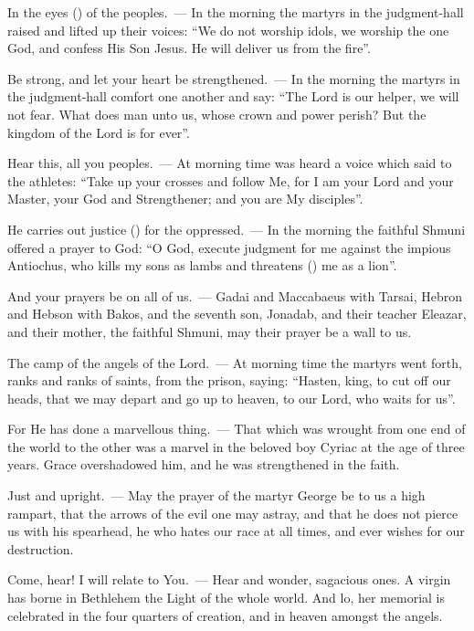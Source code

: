 \documentclass[12pt,twoside,a5paper]{article}
\begin{document}
\begin{halfparskip}
  In the eyes () of the peoples.~--- In the morning the martyrs in the judgment-hall raised and lifted up their voices: ``We do not worship idols, we worship the one God, and confess His Son Jesus. He will deliver us from the fire''.

  Be strong, and let your heart be strengthened.~--- In the morning the martyrs in the judgment-hall comfort one another and say: ``The Lord is our helper, we will not fear. What does man unto us, whose crown and power perish? But the kingdom of the Lord is for ever''.

  Hear this, all you peoples.~--- At morning time was heard a voice which said to the athletes: ``Take up your crosses and follow Me, for I am your Lord and your Master, your God and Strengthener; and you are My disciples''.

  He carries out justice () for the oppressed.~--- In the morning the faithful Shmuni offered a prayer to God: ``O God, execute judgment for me against the impious Antiochus, who kills my sons as lambs and threatens () me as a lion''.

  And your prayers be on all of us.~--- Gadai and Maccabaeus with Tarsai, Hebron and Hebson with Bakos, and the seventh son, Jonadab, and their teacher Eleazar, and their mother, the faithful Shmuni, may their prayer be a wall to us.

  The camp of the angels of the Lord.~--- At morning time the martyrs went forth, ranks and ranks of saints, from the prison, saying: ``Hasten, king, to cut off our heads, that we may depart and go up to heaven, to our Lord, who waits for us''.

  For He has done a marvellous thing.~--- That which was wrought from one end of the world to the other was a marvel in the beloved boy Cyriac at the age of three years. Grace overshadowed him, and he was strengthened in the faith.

  Just and upright.~--- May the prayer of the martyr George be to us a high rampart, that the arrows of the evil one may astray, and that he does not pierce us with his spearhead, he who hates our race at all times, and ever wishes for our destruction.

  Come, hear! I will relate to You.~--- Hear and wonder, sagacious ones. A virgin has borne in Bethlehem the Light of the whole world. And lo, her memorial is celebrated in the four quarters of creation, and in heaven amongst the angels.


\end{halfparskip}
\end{document}
